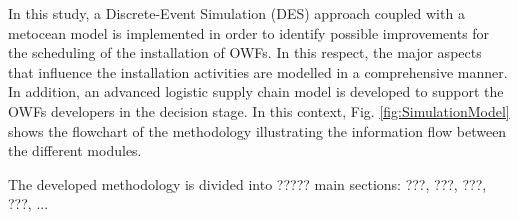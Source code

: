 In this study, a Discrete-Event Simulation (DES) approach coupled with a metocean model is implemented in order to identify possible improvements for the scheduling of the installation of OWFs. In this respect, the major aspects that influence the installation activities are modelled in a comprehensive manner. In addition, an advanced logistic supply chain model is developed to support the OWFs developers in the decision stage. In this context, Fig. \ref{fig:SimulationModel} shows the flowchart of the methodology illustrating the information flow between the different modules.

The developed methodology is divided into ????? main sections: ???, ???, ???, ???, ...